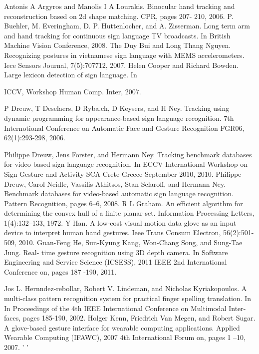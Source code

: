 \documentclass{report}           %
\begin{document}
\begin{thebibliography}{60}

 Antonis  A Argyros  and  Manolis I A Lourakis.   Binocular  hand  tracking  and reconstruction  based on 2d shape matching. CPR, pages 207- 210, 2006.
 P.  Buehler,  M. Everingham,  D. P. Huttenlocher,  and A. Zisserman.  Long term arm and hand  tracking  for continuous sign language TV broadcasts.   In British Machine  Vision Conference, 2008.
   The  Duy Bui and Long Thang Nguyen. Recognizing postures in vietnamese sign language with MEMS accelerometers.  Iece Sensors Journal, 7(5):707712, 2007.
  Helen Cooper and Richard Bowden. Large lexicon detection  of sign language.  In

ICCV,  Workshop Human  Comp. Inter, 2007.

   P Dreuw,  T Deselaers, D Ryba.ch, D Keysers,  and H Ney. Tracking using dynamic programming  for appearance-based  sign language recognition.  7th Internotional Conference on Automatic  Face and Gesture Recognition FGR06, 62(1):293-298,
2006.

   Philippe Dreuw, Jens Forster, and Hermann Ney.  Tracking benchmark databases for video-based sign language recognition.  In ECCV  International  Workshop on Sign Gesture and Activity  SCA  Crete Greece September 2010, 2010.
  Philippe  Dreuw,   Carol  Neidle,   Vassilis Athitsos,    Stan  Sclaroff, and  Hermann Ney. Benchmark databases  for video-based automatic  sign language recognition. Pattern  Recognition, pages 6--6, 2008.
  R L Graham.   An efficient algorithm  for determining  the convex hull of a finite planar  set.  Information  Processing Letters, 1(4):132--133, 1972. 
  Y  Han.    A  low-cost  visual   motion   data   glove  as  an  input   device  to  interpret human   hand  gestures.   Ieee Trans Consum Electron, 56(2):501-509, 2010.
  Guan-Feng He, Sun-Kyung Kang, Won-Chang Song, and Sung-Tae Jung.  Real- time gesture recognition using 3D depth  camera.  In Software Engineering and Service Science  (ICSESS),  2011 IEEE  2nd International  Conference on, pages
187 -190, 2011.

  Jos L. Hernndez-rebollar,  Robert V. Lindeman, and Nicholas Kyriakopoulos. A multi-class pattern  recognition system for practical finger spelling translation.  In In Proceedings of the 4th IEEE  International  Conference on Multimodal Inter- faces, pages 185-190, 2002.
  Holger Kenn,  Friedrich Van Megen, and  Robert  Sugar.  A glove-based gesture interface  for wearable  computing  applications.    Applied  Wearable Computing
(IFAWC),  2007 4th International  Forum on, pages 1  --10,   2007.
'                   '


\end{thebibliography}
\end{document}
